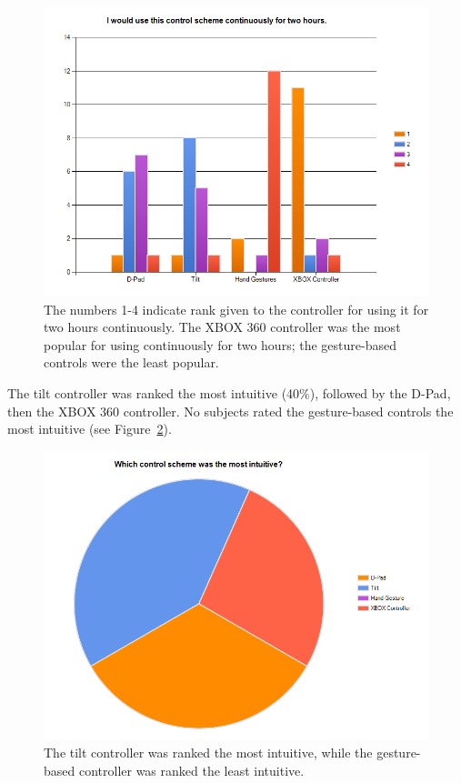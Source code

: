 \documentclass[12pt, letterpaper]{report}
\begin{document}
\begin{figure}[h!]
	\centering
	\includegraphics[width=4.5in]{images/sm_51.png}
	\caption{The numbers 1-4 indicate rank given to the controller for using it for two hours continuously. The XBOX 360 controller was the most popular for using continuously for two hours; the gesture-based controls were the least popular.}
	\label{sm_51}
\end{figure}

The tilt controller was ranked the most intuitive (40\%), followed by the D-Pad, then the XBOX 360 controller. No subjects rated the gesture-based controls the most intuitive (see Figure~\ref{sm_52}).

\begin{figure}[h!]
	\centering
	\includegraphics[width=4.5in]{images/sm_52.png}
	\caption{The tilt controller was ranked the most intuitive, while the gesture-based controller was ranked the least intuitive.}
	\label{sm_52}
\end{figure}
\end{document}
